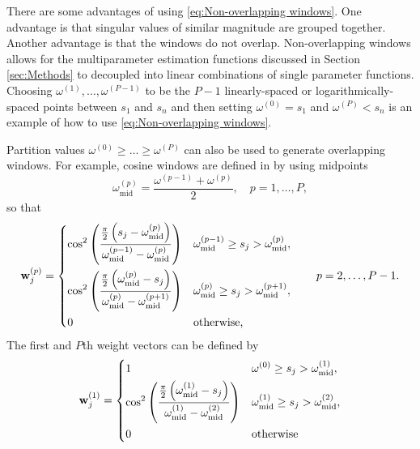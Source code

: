 \documentclass[12pt]{article}
\newcommand{\wVec}{\mathbf{w}}	%
\newcommand{\partition}{\omega}  %
\newcommand{\midpoint}{\partition_{\text{mid}}}   %
\newcommand{\singular}{s}	%
\begin{document}
There are some advantages of using \eqref{eq:Non-overlapping windows}. One advantage is that singular values of similar magnitude are grouped together. Another advantage is that the windows do not overlap. Non-overlapping windows allows for the multiparameter estimation functions discussed in Section \ref{sec:Methods} to decoupled into linear combinations of single parameter functions. Choosing $\partition^{(1)},\ldots,\partition^{(P-1)}$ to be the $P-1$ linearly-spaced or logarithmically-spaced points between $\singular_1$ and $\singular_n$ and then setting $\partition^{(0)} = \singular_1$ and $\partition^{(P)} < \singular_n$ is an example of how to use \eqref{eq:Non-overlapping windows}. \par 
Partition values $\partition^{(0)} \geq \ldots \geq \partition^{(P)}$ can also be used to generate overlapping windows. For example, cosine windows are defined in \cite{ChungEasleyOLeary} by using midpoints
\begin{equation}
\label{eq:Midpoints}
    \midpoint^{(p)} = \frac{\partition^{(p-1)} + \partition^{(p)}}{2}, \quad p = 1,\ldots,P,
\end{equation}
so that
\begin{equation}
\label{eq:Middle cosine windows}
    \wVec_j^{(p)} = \begin{dcases}
    \cos^2\left(\frac{\frac{\pi}{2}\left(\singular_j - \midpoint^{(p)}\right)}{\midpoint^{(p-1)} - \midpoint^{(p)}}\right) & \midpoint^{(p-1)} \geq \singular_j > \midpoint^{(p)}, \\
    \cos^2\left(\frac{\frac{\pi}{2}\left(\midpoint^{(p)} - \singular_j\right)}{\midpoint^{(p)} - \midpoint^{(p+1)}}\right) & \midpoint^{(p)} \geq \singular_j > \midpoint^{(p+1)}, \\
    0 & \text{otherwise,}
    \end{dcases} \qquad p = 2,\ldots,P-1.
\end{equation}
The first and $P$th weight vectors can be defined by 
\begin{equation}
\label{eq:First cosine window}
     \wVec_j^{(1)} = \begin{dcases}
    1 & \omega^{(0)} \geq \singular_j > \midpoint^{(1)}, \\
    \cos^2\left(\frac{\frac{\pi}{2}\left(\midpoint^{(1)} - \singular_j\right)}{\midpoint^{(1)} - \midpoint^{(2)}}\right) & \midpoint^{(1)} \geq \singular_j > \midpoint^{(2)}, \\
    0 & \text{otherwise}
    \end{dcases}
\end{equation}
\end{document}
